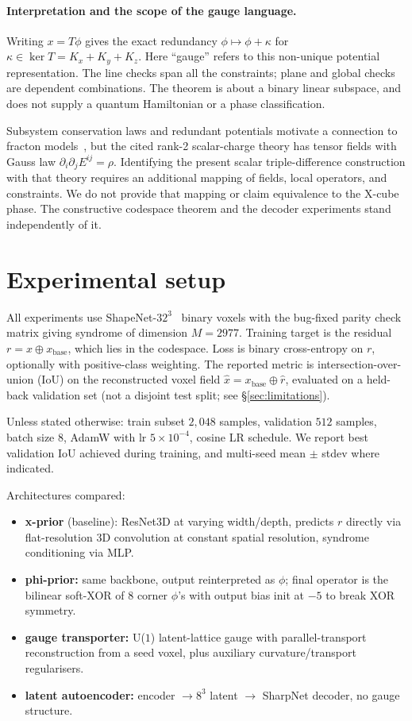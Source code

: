 \documentclass[11pt,a4paper]{article}
\begin{document}
\paragraph{Interpretation and the scope of the gauge language.}
Writing $x=T\phi$ gives the exact redundancy
$\phi\mapsto\phi+\kappa$ for $\kappa\in\ker T=K_x+K_y+K_z$.
Here ``gauge'' refers to this non-unique potential representation.
The line checks span all the constraints; plane and global checks are
dependent combinations. The theorem is about a binary linear subspace,
and does not supply a quantum Hamiltonian or a phase classification.

Subsystem conservation laws and redundant potentials motivate a connection
to fracton models~\cite{pretko2017,vijay2016,haah2011}, but the cited
rank-2 scalar-charge theory has tensor fields with Gauss law
$\partial_i\partial_j E^{ij}=\rho$. Identifying the present scalar
triple-difference construction with that theory requires an additional
mapping of fields, local operators, and constraints. We do not provide
that mapping or claim equivalence to the X-cube phase. The constructive
codespace theorem and the decoder experiments stand independently of it.

\section{Experimental setup}
\label{sec:setup}

All experiments use ShapeNet-$32^3$~\cite{shapenet} binary voxels with
the bug-fixed parity check matrix giving syndrome of dimension $M =
2977$. Training target is the residual $r = x \oplus x_{\text{base}}$,
which lies in the codespace. Loss is binary cross-entropy on $r$,
optionally with positive-class weighting. The reported metric is
intersection-over-union (IoU) on the reconstructed voxel field $\hat x =
x_{\text{base}} \oplus \hat r$, evaluated on a held-back validation set
(not a disjoint test split; see \S\ref{sec:limitations}).

Unless stated otherwise: train subset $2{,}048$ samples, validation
$512$ samples, batch size $8$, AdamW with lr $5 \times 10^{-4}$, cosine
LR schedule. We report best validation IoU achieved during training,
and multi-seed mean $\pm$ stdev where indicated.

Architectures compared:
\begin{itemize}[nosep]
\item \textbf{x-prior} (baseline): ResNet3D at varying width/depth, predicts $r$ directly via flat-resolution $3$D convolution at constant spatial resolution, syndrome conditioning via MLP.
\item \textbf{phi-prior:} same backbone, output reinterpreted as $\phi$; final operator is the bilinear soft-XOR of $8$ corner $\phi$'s with output bias init at $-5$ to break XOR symmetry.
\item \textbf{gauge transporter:} U($1$) latent-lattice gauge with parallel-transport reconstruction from a seed voxel, plus auxiliary curvature/transport regularisers.
\item \textbf{latent autoencoder:} encoder $\to 8^3$ latent $\to$ SharpNet decoder, no gauge structure.
\end{itemize}
\end{document}
